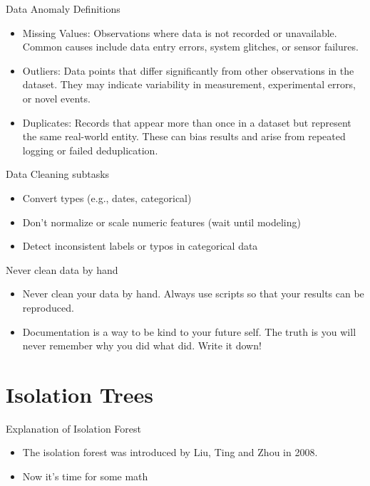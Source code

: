 \documentclass[aspectratio=169]{beamer}
\begin{document}
\begin{frame}[label={sec:orgcc00be1}]{Data Anomaly Definitions}
\begin{itemize}
\item \alert{Missing Values}: Observations where data is not recorded or
unavailable. Common causes include data entry errors, system
glitches, or sensor failures.

\item \alert{Outliers}: Data points that differ significantly from other
observations in the dataset. They may indicate variability in
measurement, experimental errors, or novel events.

\item \alert{Duplicates}: Records that appear more than once in a dataset but
represent the same real-world entity. These can bias results and
arise from repeated logging or failed deduplication.
\end{itemize}
\end{frame}
\begin{frame}[label={sec:org02c7bd7}]{Data Cleaning subtasks}
\begin{itemize}
\item Convert types (e.g., dates, categorical)

\item Don't normalize or scale numeric features (wait until modeling)

\item Detect inconsistent labels or typos in categorical data
\end{itemize}
\end{frame}


\begin{frame}[label={sec:org335fcb9}]{Never clean data by hand}
\begin{itemize}
\item Never clean your data by hand.  Always use scripts so that your
results can be reproduced.

\item Documentation is a way to be kind to your future self. The truth
is you will never remember why you did what did. Write it down!
\end{itemize}
\end{frame}

\section{Isolation Trees}
\label{sec:orga939dc3}
\begin{frame}[label={sec:org65c4d2e}]{Explanation of Isolation Forest}
\begin{itemize}
\item The isolation forest was introduced by Liu, Ting and Zhou in 2008.
\end{itemize}
\pause
\begin{itemize}
\item Now it's time for some math
\end{itemize}
\end{frame}
\end{document}
